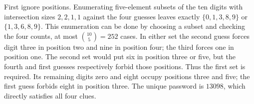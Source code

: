 First ignore positions. Enumerating five-element subsets of the ten digits with intersection sizes $2,2,1,1$ against the four guesses leaves exactly $\{0,1,3,8,9\}$ or $\{1,3,6,8,9\}$. This enumeration can be done by choosing a subset and checking the four counts, at most $\binom{10}{5}=252$ cases. In either set the second guess forces digit three in position two and nine in position four; the third forces one in position one. The second set would put six in position three or five, but the fourth and first guesses respectively forbid those positions. Thus the first set is required. Its remaining digits zero and eight occupy positions three and five; the first guess forbids eight in position three. The unique password is $\boxed{13098}$, which directly satisfies all four clues.
